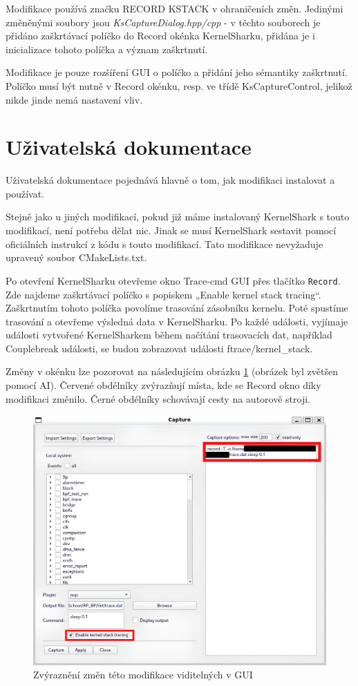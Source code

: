 Modifikace používá značku RECORD KSTACK v ohraničeních změn. Jedinými změněnými soubory jsou \emph{KsCaptureDialog.hpp/cpp} - v těchto souborech je přidáno zaškrtávací políčko do Record okénka KernelSharku, přidána je i inicializace tohoto políčka a význam zaškrtnutí.

Modifikace je pouze rozšíření GUI o políčko a přidání jeho sémantiky zaškrtnutí. Políčko musí být nutně v Record okénku, resp. ve třídě KsCaptureControl, jelikož nikde jinde nemá nastavení vliv.

\section{Uživatelská dokumentace}
Uživatelská dokumentace pojednává hlavně o tom, jak modifikaci instalovat a používat.

Stejně jako u jiných modifikací, pokud již máme instalovaný KernelShark s touto modifikací, není potřeba dělat nic. Jinak se musí KernelShark sestavit pomocí oficiálních instrukcí z kódu s touto modifikací. Tato modifikace nevyžaduje upravený soubor CMakeLists.txt.

Po otevření KernelSharku otevřeme okno Trace-cmd GUI přes tlačítko \texttt{Record}. Zde najdeme zaškrtávací políčko s popiskem „Enable kernel stack tracing“.
Zaškrtnutím tohoto políčka povolíme trasování zásobníku kernelu. Poté spustíme trasování a otevřeme výsledná data v KernelSharku. Po každé události, vyjímaje události vytvořené KernelSharkem během načítání trasovacích dat, například Couplebreak události, se budou zobrazovat události ftrace/kernel\_stack.

Změny v okénku lze pozorovat na následujícím obrázku \ref{obr01:record-kstack} (obrázek byl zvětšen pomocí AI). Červené obdélníky zvýrazňují místa, kde se Record okno díky modifikaci změnilo. Černé obdélníky schovávají cesty na autorově stroji.

\begin{figure}[p]\centering
    \includegraphics[width=140mm]{img/Modifikace/modif-record-kstack}
    \caption{Zvýraznění změn této modifikace viditelných v GUI}
    \label{obr01:record-kstack}
\end{figure}

